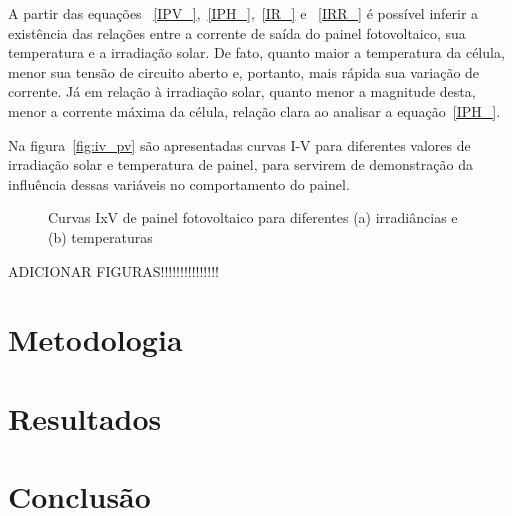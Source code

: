 \documentclass[
	12pt,				%
	openright,			%
	onseside,
	a4paper,			%
	english,			%
	french,				%
	spanish,			%
	brazil,				%
	]{abntex2}
\begin{document}
A partir das equações ~\ref{IPV_},~\ref{IPH_},~\ref{IR_} e ~\ref{IRR_} é possível inferir a existência das relações entre a corrente de saída do painel fotovoltaico, sua temperatura e a irradiação solar. De fato, quanto maior a temperatura da célula, menor sua tensão de circuito aberto e, portanto, mais rápida sua variação de corrente. Já em relação à irradiação solar, quanto menor a magnitude desta, menor a corrente máxima da célula, relação clara ao analisar a equação~\ref{IPH_}.

Na figura~\ref{fig:iv_pv} são apresentadas curvas I-V para diferentes valores de irradiação solar e temperatura de painel, para servirem de demonstração da influência dessas variáveis no comportamento do painel.

\begin{figure}%
	\centering
	\qquad
	\caption{Curvas IxV de painel fotovoltaico para diferentes (a) irradiâncias e (b) temperaturas}%
	\label{fig:iv_pv_}%
\end{figure}
ADICIONAR FIGURAS!!!!!!!!!!!!!!!

\chapter{Metodologia}

\chapter{Resultados}

\chapter{Conclusão}
\end{document}
